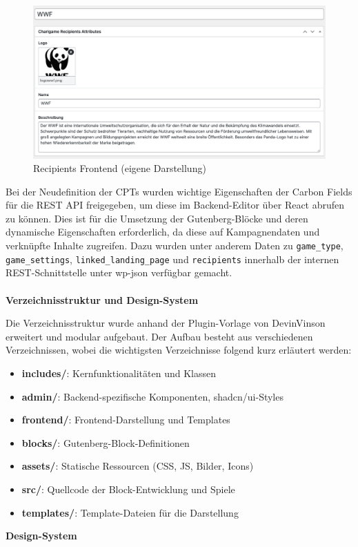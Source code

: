 \begin{figure}[H]
    \centering
    \includegraphics[width=1\textwidth]{images/new_recipients_backend}
    \caption{Recipients Frontend (eigene Darstellung)}
    \label{fig:new-recipients-frontend}
\end{figure}

Bei der Neudefinition der CPTs wurden wichtige Eigenschaften der Carbon Fields für die REST API freigegeben, um diese im Backend-Editor über React abrufen zu können.
Dies ist für die Umsetzung der Gutenberg-Blöcke und deren dynamische Eigenschaften erforderlich, da diese auf Kampagnendaten und verknüpfte Inhalte zugreifen.
Dazu wurden unter anderem Daten zu \texttt{game\_type}, \texttt{game\_settings}, \texttt{linked\_landing\_page} und \texttt{recipients} innerhalb der internen REST-Schnittstelle unter wp-json verfügbar gemacht.
\\\\
\textbf{Verzeichnisstruktur und Design-System}

Die Verzeichnisstruktur wurde anhand der Plugin-Vorlage von DevinVinson erweitert und modular aufgebaut.
Der Aufbau besteht aus verschiedenen Verzeichnissen, wobei die wichtigsten Verzeichnisse folgend kurz erläutert werden:

\begin{itemize}
    \item \textbf{includes/}: Kernfunktionalitäten und Klassen
    \item \textbf{admin/}: Backend-spezifische Komponenten, shadcn/ui-Styles
    \item \textbf{frontend/}: Frontend-Darstellung und Templates
    \item \textbf{blocks/}: Gutenberg-Block-Definitionen
    \item \textbf{assets/}: Statische Ressourcen (CSS, JS, Bilder, Icons)
    \item \textbf{src/}: Quellcode der Block-Entwicklung und Spiele
    \item \textbf{templates/}: Template-Dateien für die Darstellung
\end{itemize}
\vspace{0.5em}
\textbf{Design-System}

